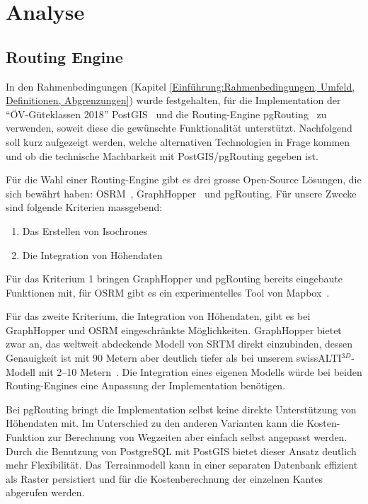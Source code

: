 
\section{Analyse}
\label{Analyse}

\subsection{Routing Engine}
\label{Analyse:Routing Engine}

In den Rahmenbedingungen (Kapitel \ref{Einführung:Rahmenbedingungen, Umfeld, Definitionen, Abgrenzungen}) wurde festgehalten, für die Implementation der "`\gls{ÖV-Güteklassen} 2018"' PostGIS~\cite{postgis} und die \gls{Routing-Engine} pgRouting~\cite{pgRouting} zu verwenden, soweit diese die gewünschte Funktionalität unterstützt.
Nachfolgend soll kurz aufgezeigt werden, welche alternativen Technologien in Frage kommen und ob die technische Machbarkeit mit PostGIS/pgRouting gegeben ist.

Für die Wahl einer \gls{Routing-Engine} gibt es drei grosse Open-Source Lösungen, die sich bewährt haben: OSRM~\cite{osrm}, GraphHopper~\cite{graphhopper} und pgRouting.
Für unsere Zwecke sind folgende Kriterien massgebend:

\begin{enumerate}
    \item Das Erstellen von \glspl{Isochrone}
    \item Die Integration von Höhendaten
\end{enumerate}

Für das Kriterium 1 bringen GraphHopper und pgRouting bereits eingebaute Funktionen mit, für OSRM gibt es ein experimentelles Tool von Mapbox~\cite{mapbox_osrm_isochrone}.

Für das zweite Kriterium, die Integration von Höhendaten, gibt es bei GraphHopper und OSRM eingeschränkte Möglichkeiten. GraphHopper bietet zwar an, das weltweit abdeckende Modell von \ac{SRTM} direkt einzubinden, dessen Genauigkeit ist mit 90 Metern aber deutlich tiefer als bei unserem swissALTI$^{3D}$-Modell mit 2--10 Metern~\cite{swissalti3d_swisstopo}. Die Integration eines eigenen Modells würde bei beiden \glspl{Routing-Engine} eine Anpassung der Implementation benötigen.

Bei pgRouting bringt die Implementation selbst keine direkte Unterstützung von Höhendaten mit.
Im Unterschied zu den anderen Varianten kann die Kosten-Funktion zur Berechnung von Wegzeiten aber einfach selbst angepasst werden.
Durch die Benutzung von PostgreSQL mit PostGIS bietet dieser Ansatz deutlich mehr Flexibilität.
Das \gls{Terrainmodell} kann in einer separaten Datenbank effizient als Raster persistiert und für die Kostenberechnung der einzelnen \glspl{Kante} abgerufen werden.

